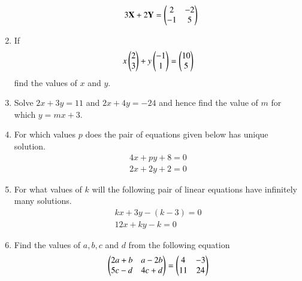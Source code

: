 \begin{enumerate}[label=\thesubsection.\arabic*,ref=\thesubsection.\theenumi]
\begin{enumerate}
\begin{align}
	\\
	3\mathbf{X}+2\mathbf{Y}&=\begin{pmatrix}2 & -2 \\ -1 & 5\end{pmatrix}
\end{align}
\end{enumerate}
\item If 
\begin{align}
	x \begin{pmatrix}2 \\ 3\end{pmatrix} + y \begin{pmatrix}-1 \\ 1\end{pmatrix}= \begin{pmatrix}10 \\ 5\end{pmatrix}
\end{align}
find the values of $x$ and $y$.
\item Solve $2x+3y=11$ and $2x+4y=-24$ and hence find the value of $m$ for which $y=mx+3$.
\item For which values $p$ does the pair of equations given below has unique solution.
\begin{align}
4x+py+8 = 0 \\ 2x+2y+2 = 0
\end{align}
\item For what values of $k$ will the following pair of linear equations have infinitely many solutions.
\begin{align}
kx+3y-(k-3) = 0 \\ 12x+ky-k = 0
\end{align}
\item Find the values of $a, b, c$ and $d$ from the following equation 
\begin{align} 
\begin{pmatrix}2a+b&a-2b\\5c-d&4c+d\end{pmatrix} = \begin{pmatrix}4&-3\\11&24\end{pmatrix} 
\end{align}
\end{enumerate}
